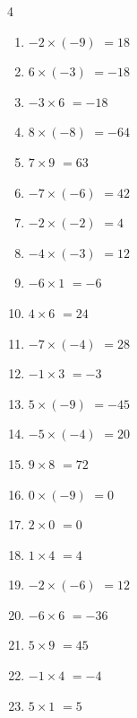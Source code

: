 \begin{multicols}{4}
\begin{enumerate}
  \item $-2\times (-9)$
        $=18$

  \item $6\times (-3)$
        $=-18$

  \item $-3\times 6$
        $=-18$

  \item $8\times (-8)$
        $=-64$

  \item $7\times 9$
        $=63$

  \item $-7\times (-6)$
        $=42$

  \item $-2\times (-2)$
        $=4$

  \item $-4\times (-3)$
        $=12$

  \item $-6\times 1$
        $=-6$

  \item $4\times 6$
        $=24$

  \item $-7\times (-4)$
        $=28$

  \item $-1\times 3$
        $=-3$

  \item $5\times (-9)$
        $=-45$

  \item $-5\times (-4)$
        $=20$

  \item $9\times 8$
        $=72$

  \item $0\times (-9)$
        $=0$

  \item $2\times 0$
        $=0$

  \item $1\times 4$
        $=4$

  \item $-2\times (-6)$
        $=12$

  \item $-6\times 6$
        $=-36$

  \item $5\times 9$
        $=45$

  \item $-1\times 4$
        $=-4$

  \item $5\times 1$
        $=5$


\end{enumerate}
\end{multicols}
